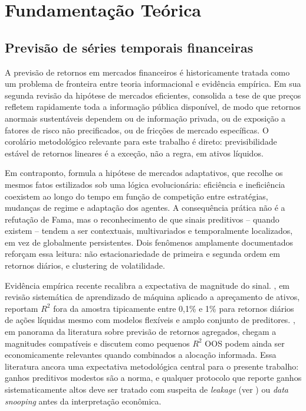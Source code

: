 \chapter{Fundamentação Teórica}


\section{Previsão de séries temporais financeiras}
A previsão de retornos em mercados financeiros é historicamente tratada como um problema de fronteira entre teoria informacional e evidência empírica. Em sua segunda revisão da hipótese de mercados eficientes, \cite{FAMA1991} consolida a tese de que preços refletem rapidamente toda a informação pública disponível, de modo que retornos anormais sustentáveis dependem ou de informação privada, ou de exposição a fatores de risco não precificados, ou de fricções de mercado específicas. O corolário metodológico relevante para este trabalho é direto: previsibilidade estável de retornos lineares é a exceção, não a regra, em ativos líquidos.

Em contraponto, \cite{LO2004} formula a hipótese de mercados adaptativos, que recolhe os mesmos fatos estilizados sob uma lógica evolucionária: eficiência e ineficiência coexistem ao longo do tempo em função de competição entre estratégias, mudanças de regime e adaptação dos agentes. A consequência prática não é a refutação de Fama, mas o reconhecimento de que sinais preditivos -- quando existem -- tendem a ser contextuais, multivariados e temporalmente localizados, em vez de globalmente persistentes. Dois fenômenos amplamente documentados reforçam essa leitura: não estacionariedade de primeira e segunda ordem em retornos diários, e clustering de volatilidade.

Evidência empírica recente recalibra a expectativa de magnitude do sinal. \cite{GU2020}, em revisão sistemática de aprendizado de máquina aplicado a apreçamento de ativos, reportam $R^2$ fora da amostra tipicamente entre 0,1\% e 1\% para retornos diários de ações líquidas mesmo com modelos flexíveis e amplo conjunto de preditores. \cite{RAPACH2013}, em panorama da literatura sobre previsão de retornos agregados, chegam a magnitudes compatíveis e discutem como pequenos $R^2$ OOS podem ainda ser economicamente relevantes quando combinados a alocação informada. Essa literatura ancora uma expectativa metodológica central para o presente trabalho: ganhos preditivos modestos são a norma, e qualquer protocolo que reporte ganhos sistematicamente altos deve ser tratado com suspeita de \textit{leakage} (ver ) ou \textit{data snooping} antes da interpretação econômica.


